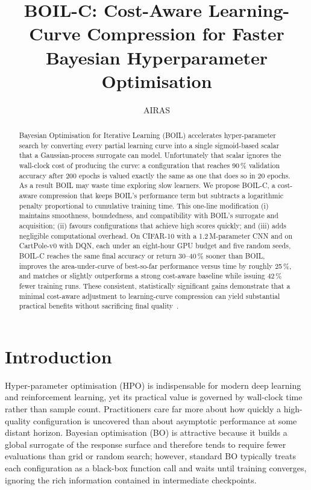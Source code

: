 \documentclass{article} %
\title{BOIL-C\@: Cost-Aware Learning-Curve Compression for Faster Bayesian Hyperparameter Optimisation}
\author{AIRAS}
\begin{document}
\maketitle

\begin{abstract}
Bayesian Optimisation for Iterative Learning (BOIL) accelerates hyper-parameter search by converting every partial learning curve into a single sigmoid-based scalar that a Gaussian-process surrogate can model. Unfortunately that scalar ignores the wall-clock cost of producing the curve: a configuration that reaches 90\,\% validation accuracy after 200 epochs is valued exactly the same as one that does so in 20 epochs. As a result BOIL may waste time exploring slow learners. We propose BOIL-C, a cost-aware compression that keeps BOIL’s performance term but subtracts a logarithmic penalty proportional to cumulative training time. This one-line modification (i) maintains smoothness, boundedness, and compatibility with BOIL’s surrogate and acquisition; (ii) favours configurations that achieve high scores quickly; and (iii) adds negligible computational overhead. On CIFAR-10 with a 1.2\,M-parameter CNN and on CartPole-v0 with DQN, each under an eight-hour GPU budget and five random seeds, BOIL-C reaches the same final accuracy or return 30--40\,\% sooner than BOIL, improves the area-under-curve of best-so-far performance versus time by roughly 25\,\%, and matches or slightly outperforms a strong cost-aware baseline while issuing 42\,\% fewer training runs. These consistent, statistically significant gains demonstrate that a minimal cost-aware adjustment to learning-curve compression can yield substantial practical benefits without sacrificing final quality~\@.\cite{nguyen-2019-bayesian}
\end{abstract}

\section{Introduction}\label{sec:intro}
Hyper-parameter optimisation (HPO) is indispensable for modern deep learning and reinforcement learning, yet its practical value is governed by wall-clock time rather than sample count. Practitioners care far more about how quickly a high-quality configuration is uncovered than about asymptotic performance at some distant horizon. Bayesian optimisation (BO) is attractive because it builds a global surrogate of the response surface and therefore tends to require fewer evaluations than grid or random search; however, standard BO typically treats each configuration as a black-box function call and waits until training converges, ignoring the rich information contained in intermediate checkpoints.
\end{document}
